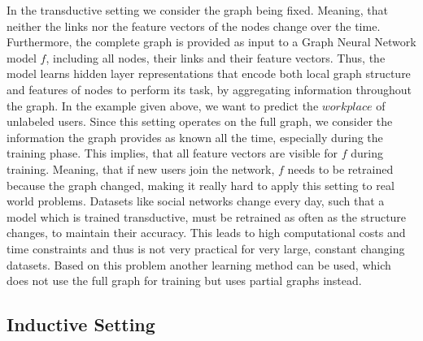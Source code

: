       In the transductive setting \cite{kipf2017semisupervised} we consider the graph being fixed.
      Meaning, that neither the links nor the feature vectors of the nodes change over the time.
      Furthermore, the complete graph is provided as input to a Graph Neural Network model $f$, including all nodes, their links and their feature vectors.
      Thus, the model learns hidden layer representations that encode both local graph structure and features of nodes to perform its task, by aggregating information throughout the graph.
      In the example given above, we want to predict the $workplace$ of unlabeled users.
      Since this setting operates on the full graph, we consider the information the graph provides as known all the time, especially during the training phase.
      This implies, that all feature vectors are visible for $f$ during training.
      Meaning, that if new users join the network, $f$ needs to be retrained because the graph changed, making it really hard to apply this setting to real world problems.
      Datasets like social networks change every day, such that a model which is trained transductive, must be retrained as often as the structure changes, to maintain their accuracy.
      This leads to high computational costs and time constraints and thus is not very practical for very large, constant changing datasets.
      Based on this problem another learning method can be used, which does not use the full graph for training but uses partial graphs instead.

    \subsection*{Inductive Setting}

